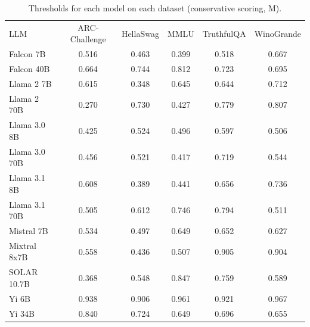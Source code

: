\begin{table}[h]
\caption{Thresholds for each model on each dataset (conservative scoring, M). }
\label{tab:thresholds_prob_max_k20_w2}
\centering
\begin{tabular}{l S[table-format=3.1] S[table-format=3.1] S[table-format=3.1] S[table-format=3.1] S[table-format=3.1]}
\toprule
LLM & ARC-Challenge & HellaSwag & MMLU & TruthfulQA & WinoGrande \\ 
\cmidrule(lr){1-1} \cmidrule(lr){2-2} \cmidrule(lr){3-3} \cmidrule(lr){4-4} \cmidrule(lr){5-5} \cmidrule(lr){6-6}
Falcon 7B & 0.516 & 0.463 & 0.399 & 0.518 & 0.667\\
Falcon 40B & 0.664 & 0.744 & 0.812 & 0.723 & 0.695\\
Llama 2 7B & 0.615 & 0.348 & 0.645 & 0.644 & 0.712\\
Llama 2 70B & 0.270 & 0.730 & 0.427 & 0.779 & 0.807\\
Llama 3.0 8B & 0.425 & 0.524 & 0.496 & 0.597 & 0.506\\
Llama 3.0 70B & 0.456 & 0.521 & 0.417 & 0.719 & 0.544\\
Llama 3.1 8B & 0.608 & 0.389 & 0.441 & 0.656 & 0.736\\
Llama 3.1 70B & 0.505 & 0.612 & 0.746 & 0.794 & 0.511\\
Mistral 7B & 0.534 & 0.497 & 0.649 & 0.652 & 0.627\\
Mixtral 8x7B & 0.558 & 0.436 & 0.507 & 0.905 & 0.904\\
SOLAR 10.7B & 0.368 & 0.548 & 0.847 & 0.759 & 0.589\\
Yi 6B & 0.938 & 0.906 & 0.961 & 0.921 & 0.967\\
Yi 34B & 0.840 & 0.724 & 0.649 & 0.696 & 0.655\\
\bottomrule
\end{tabular}
\end{table}
